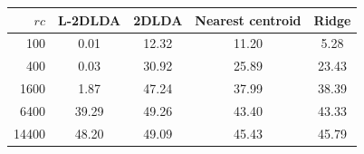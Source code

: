 \begin{tabular}{rcccc}
\toprule
$rc$ & L-2DLDA & 2DLDA & Nearest centroid & Ridge \\
\midrule
100 & 0.01 & 12.32 & 11.20 & 5.28 \\
400 & 0.03 & 30.92 & 25.89 & 23.43 \\
1600 & 1.87 & 47.24 & 37.99 & 38.39 \\
6400 & 39.29 & 49.26 & 43.40 & 43.33 \\
14400 & 48.20 & 49.09 & 45.43 & 45.79 \\
\bottomrule
\end{tabular}
